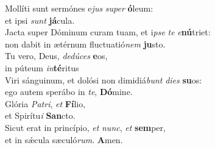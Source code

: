 \evenverse Mollíti sunt sermónes e\textit{jus} \textit{su}\textit{per} \textbf{ó}leum:~\*\\
\evenverse et ipsi \textit{sunt} \textbf{já}cula.\\
\oddverse Jacta super Dóminum curam tuam, et i\textit{pse} \textit{te} \textit{e}\textbf{nú}triet:~\*\\
\oddverse non dabit in ætérnum fluctuatió\textit{nem} \textbf{ju}sto.\\
\evenverse Tu vero, Deus, \textit{de}\textit{dú}\textit{ces} \textbf{e}os,~\*\\
\evenverse in púteum \textit{in}\textbf{té}ritus\\
\oddverse Viri sánguinum, et dolósi non dimidiá\textit{bunt} \textit{di}\textit{es} \textbf{su}os:~\*\\
\oddverse ego autem sperábo in \textit{te}, \textbf{Dó}mine.\\
\evenverse Glória \textit{Pa}\textit{tri}, \textit{et} \textbf{Fí}lio,~\*\\
\evenverse et Spirítu\textit{i} \textbf{San}cto.\\
\oddverse Sicut erat in princípio, \textit{et} \textit{nunc}, \textit{et} \textbf{sem}per,~\*\\
\oddverse et in sǽcula sæculó\textit{rum}. \textbf{A}men.\\

